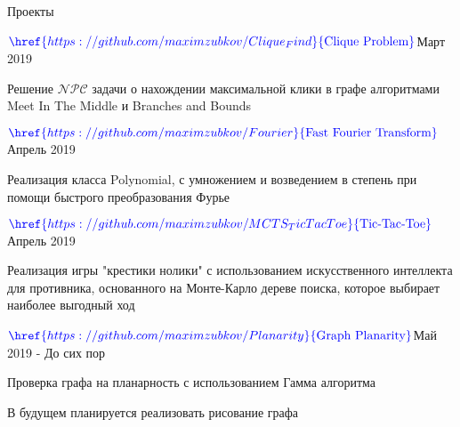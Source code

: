 \documentclass{resume} %
\begin{document}
\begin{rSection}{Проекты}
\begin{rSubsection}{$\textcolor{blue}{\href{https://github.com/maximzubkov/Clique_Find}{\textnormal{Clique Problem}}}$}{Март 2019}{}{}
\item Решение $\mathcal{NPC}$ задачи о нахождении максимальной клики в графе алгоритмами Meet In The Middle и  Branches and Bounds
\end{rSubsection}

\begin{rSubsection}{$\textcolor{blue}{\href{https://github.com/maximzubkov/Fourier}{\textnormal{Fast Fourier Transform}}}$}{Апрель 2019}{}{}
\item Реализация класса Polynomial, с умножением и возведением в степень при помощи быстрого преобразования Фурье
\end{rSubsection}

\begin{rSubsection}{$\textcolor{blue}{\href{https://github.com/maximzubkov/MCTS_TicTacToe}{\textnormal{Tic-Tac-Toe}}}$}{Апрель 2019}{}{}
\item Реализация игры "крестики нолики" с использованием искусственного интеллекта для противника, основанного на Монте-Карло дереве поиска, которое выбирает наиболее выгодный ход
\end{rSubsection}

\begin{rSubsection}{$\textcolor{blue}{\href{https://github.com/maximzubkov/Planarity}{\textnormal{Graph Planarity}}}$}{Май 2019 - До сих пор}{}{}
\item Проверка графа на планарность с использованием Гамма алгоритма
\item В будущем планируется реализовать рисование графа 
\end{rSubsection}

\end{rSection}
\end{document}
